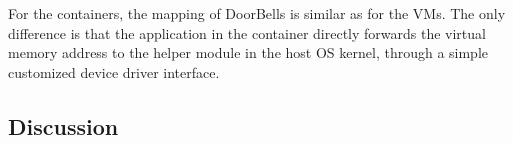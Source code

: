 For the containers, the mapping of DoorBells is similar as for the VMs. The only difference is that the application in the container directly forwards the virtual memory address to the helper module in the host OS kernel, through a simple customized device driver interface.






\subsection{Discussion}




